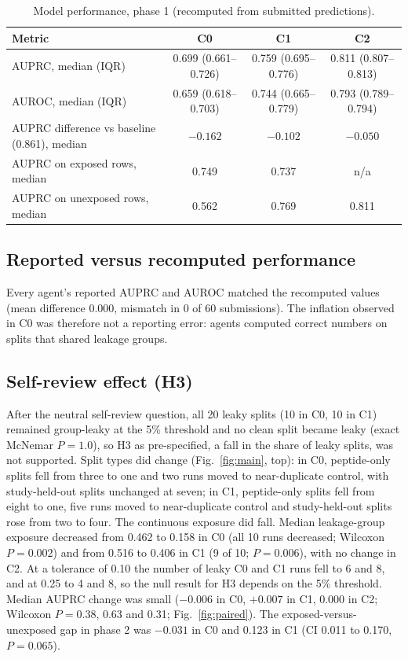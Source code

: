 \documentclass[11pt,a4paper]{article}
\begin{document}
\begin{table}[ht]
\centering
\caption{Model performance, phase 1 (recomputed from submitted predictions).}
\label{tab:perf}
\begin{tabular}{@{}lccc@{}}
\toprule
Metric & C0 & C1 & C2\\
\midrule
AUPRC, median (IQR) & 0.699 (0.661--0.726) & 0.759 (0.695--0.776) & 0.811 (0.807--0.813)\\
AUROC, median (IQR) & 0.659 (0.618--0.703) & 0.744 (0.665--0.779) & 0.793 (0.789--0.794)\\
AUPRC difference vs baseline (0.861), median & $-0.162$ & $-0.102$ & $-0.050$\\
AUPRC on exposed rows, median & 0.749 & 0.737 & n/a\\
AUPRC on unexposed rows, median & 0.562 & 0.769 & 0.811\\
\bottomrule
\end{tabular}
\end{table}

\subsection*{Reported versus recomputed performance}
Every agent's reported AUPRC and AUROC matched the recomputed values (mean difference 0.000, mismatch in 0 of 60 submissions). The inflation observed in C0 was therefore not a reporting error: agents computed correct numbers on splits that shared leakage groups.

\subsection*{Self-review effect (H3)}
After the neutral self-review question, all 20 leaky splits (10 in C0, 10 in C1) remained group-leaky at the 5\% threshold and no clean split became leaky (exact McNemar $P=1.0$), so H3 as pre-specified, a fall in the share of leaky splits, was not supported. Split types did change (Fig.~\ref{fig:main}, top): in C0, peptide-only splits fell from three to one and two runs moved to near-duplicate control, with study-held-out splits unchanged at seven; in C1, peptide-only splits fell from eight to one, five runs moved to near-duplicate control and study-held-out splits rose from two to four. The continuous exposure did fall. Median leakage-group exposure decreased from 0.462 to 0.158 in C0 (all 10 runs decreased; Wilcoxon $P=0.002$) and from 0.516 to 0.406 in C1 (9 of 10; $P=0.006$), with no change in C2. At a tolerance of 0.10 the number of leaky C0 and C1 runs fell to 6 and 8, and at 0.25 to 4 and 8, so the null result for H3 depends on the 5\% threshold. Median AUPRC change was small ($-0.006$ in C0, $+0.007$ in C1, 0.000 in C2; Wilcoxon $P=0.38$, 0.63 and 0.31; Fig.~\ref{fig:paired}). The exposed-versus-unexposed gap in phase 2 was $-0.031$ in C0 and 0.123 in C1 (CI 0.011 to 0.170, $P=0.065$).
\end{document}

